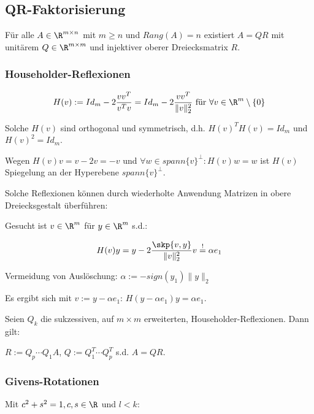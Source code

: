 \subsection*{QR-Faktorisierung}

Für alle $A \in \R^{m \times n}$ mit $m \geq n$ und $Rang(A)=n$ existiert $A=QR$ mit unitärem $Q \in \R^{m \times m}$ und injektiver oberer Dreiecksmatrix $R$.

\subsubsection*{Householder-Reflexionen}

$$H(v) := Id_m - 2 \frac{vv^T}{v^Tv} = Id_m - 2 \frac{vv^T}{\|v\|_2^2} \text{ für } \forall v \in \R^m \setminus \{0\}$$

Solche $H(v)$ sind orthogonal und symmetrisch, d.h. $H(v)^T H(v)=Id_m$ und $H(v)^2=Id_m$.

Wegen $H(v)v=v-2v=-v$ und $\forall w \in spann\{v\}^\perp : H(v)w=w$ ist $H(v)$ Spiegelung an der Hyperebene $spann\{v\}^\perp$.

Solche Reflexionen können durch wiederholte Anwendung Matrizen in obere Dreiecksgestalt überführen:

\vspace{1mm}

Gesucht ist $v \in \R^m$ für $y \in \R^m$ s.d.:

\vspace{-2mm}
$$H(v)y=y - 2 \frac{\skp{v,y}}{\|v\|_2^2}v \overset{!}{=} \alpha e_1$$

Vermeidung von Auslöschung: $\alpha := -sign(y_1)\|y\|_2$

Es ergibt sich mit $v:=y-\alpha e_1$: $H(y-\alpha e_1)y=\alpha e_1$.

\vspace{1mm}

Seien $Q_k$ die sukzessiven, auf $m \times m$ erweiterten, Householder-Reflexionen. Dann gilt:

\vspace{1mm}

$R:=Q_p \cdots Q_1 A$, $Q:=Q_1^T \cdots Q_p^T$ s.d. $A=QR$.

\subsubsection*{Givens-Rotationen}

Mit $c^2 + s^2 = 1, c, s \in \R$ und $l < k$:

